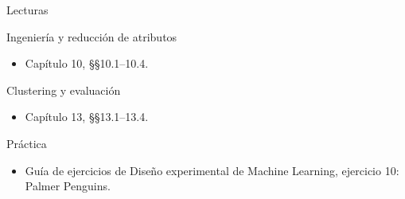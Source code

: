 \documentclass[aspectratio=169,10pt]{beamer}
\begin{document}
\begin{frame}{Lecturas}\small
\begin{block}{Ingeniería y reducción de atributos}\begin{itemize}\item Capítulo 10, §§10.1--10.4.\end{itemize}\end{block}
\begin{block}{Clustering y evaluación}\begin{itemize}\item Capítulo 13, §§13.1--13.4.\end{itemize}\end{block}
\begin{block}{Práctica}\begin{itemize}\item Guía de ejercicios de Diseño experimental de Machine Learning, ejercicio 10: Palmer Penguins.\end{itemize}\end{block}
\end{frame}
\end{document}
